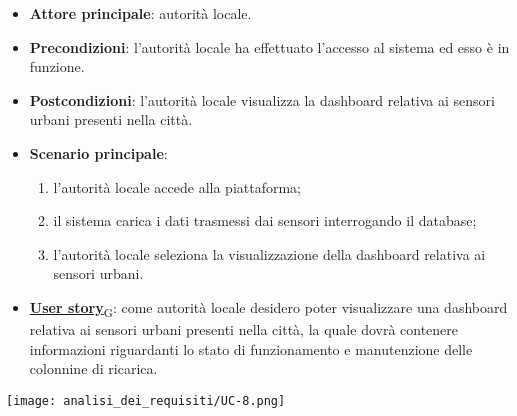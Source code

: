 \begin{itemize}
	\item \textbf{Attore principale}: autorità locale.
	\item \textbf{Precondizioni}: l'autorità locale ha effettuato l'accesso al sistema ed esso è in funzione.
	\item \textbf{Postcondizioni}: l'autorità locale visualizza la dashboard relativa
	      ai sensori urbani presenti nella città.
	\item \textbf{Scenario principale}:
	      \begin{enumerate}
		      \item l'autorità locale accede alla piattaforma;
		      \item il sistema carica i dati trasmessi dai sensori interrogando il database;
		      \item l'autorità locale seleziona la visualizzazione della dashboard relativa ai sensori urbani.
	      \end{enumerate}
	\item \href{https://7last.github.io/docs/rtb/documentazione-interna/glossario\#user-story}{\textbf{User story}\textsubscript{G}}:
	      come autorità locale desidero poter visualizzare una dashboard relativa ai sensori urbani presenti nella città, la quale
	      dovrà contenere informazioni riguardanti lo stato di funzionamento e manutenzione delle colonnine di ricarica.
\end{itemize}
\begin{center}
	\texttt{[image: analisi\_dei\_requisiti/UC-8.png]}
\end{center}


